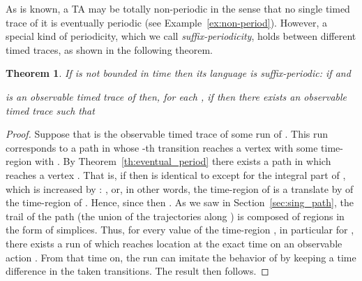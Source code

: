 \documentclass[11pt]{amsart}
\newtheorem{theorem}{Theorem}[section]
\theoremstyle{definition}
\begin{document}
As is known, a TA may be totally non-periodic in the sense that no single timed trace of it is eventually periodic (see Example~\ref{ex:non-period}).
However, a special kind of periodicity, which we call \emph{suffix-periodicity}, holds between different timed traces, as shown in the following theorem.
\begin{theorem}
\label{th:lang_eventual_period}
If  is not bounded in time then its language  is suffix-periodic:
if  and

is an observable timed trace of  then, for each , if  then there exists an observable timed trace
 such that 
\end{theorem}
\begin{proof}
Suppose that  is the observable timed trace of some run  of .
This run corresponds to a path in  whose -th transition reaches a vertex  with some time-region  with . 
By Theorem~\ref{th:eventual_period} there exists a path  in  which reaches a vertex .
That is, if  then  is identical to  except for the integral part of , which is increased by : 
, or, in other words, the time-region  of  is a translate by  of the time-region  of .
Hence, since  then .
As we saw in Section~\ref{sec:sing_path}, the trail of the path  (the union of the trajectories along ) is composed of regions in the form of simplices.
Thus, for every value of the time-region , in particular for ,   there exists a run  of  which reaches location  at the exact time  on an observable action .
From that time on, the run  can imitate the behavior of  by keeping a time difference  in the taken transitions.
The result then follows.
\end{proof}
\end{document}
